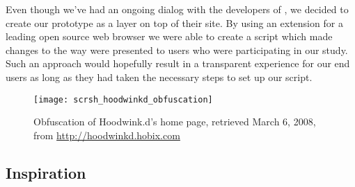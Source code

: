 Even though we've had an ongoing dialog with the developers of \urort{}, we
decided to create our prototype as a layer on top of their site.
By using an
extension
for a leading open source%
web browser we were able to create a script which
made changes to the way \urort{}
were presented to users who were participating in our study.
Such an approach would hopefully result in a transparent experience for our
end users as long as they had taken the necessary steps to set up 
our script.

\begin{figure}
  \texttt{[image: scrsh\_hoodwinkd\_obfuscation]}
  \caption[Hoodwink.d Obfuscation]{
    Obfuscation of Hoodwink.d's home page,
    retrieved March 6, 2008, from
    \url{http://hoodwinkd.hobix.com}
  }
  \label{figure:scrsh.hoodwinkd.obfuscation}
\end{figure}

\subsection{Inspiration}

